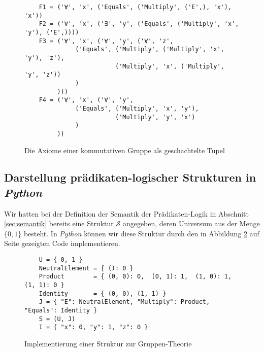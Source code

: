 \begin{figure}[!ht]
\centering
\begin{verbatim}
    F1 = ('∀', 'x', ('Equals', ('Multiply', ('E',), 'x'), 'x'))
    F2 = ('∀', 'x', ('∃', 'y', ('Equals', ('Multiply', 'x', 'y'), ('E',))))
    F3 = ('∀', 'x', ('∀', 'y', ('∀', 'z',
              ('Equals', ('Multiply', ('Multiply', 'x', 'y'), 'z'),
                         ('Multiply', 'x', ('Multiply', 'y', 'z'))
              )
         )))
    F4 = ('∀', 'x', ('∀', 'y',
              ('Equals', ('Multiply', 'x', 'y'),
                         ('Multiply', 'y', 'x')
              )
         ))        
\end{verbatim}
\vspace*{-0.3cm}
\caption{Die Axiome einer kommutativen Gruppe als geschachtelte Tupel}
\label{fig:group-theory-tupel}
\end{figure}

\subsection{Darstellung prädikaten-logischer Strukturen in \textsl{Python}}
Wir hatten bei der Definition der Semantik der Prädikaten-Logik in Abschnitt \ref{sec:semantik} bereits eine
Struktur $\mathcal{S}$ angegeben, deren Universum aus der Menge $\{ 0, 1 \}$ besteht.  In \textsl{Python}
können wir diese Struktur durch den in Abbildung \ref{fig:Group.ipynb} auf Seite \pageref{fig:Group.ipynb}
gezeigten Code implementieren. 

\begin{figure}[!ht]
\centering
\begin{verbatim}
    U = { 0, 1 }  
    NeutralElement = { (): 0 }
    Product        = { (0, 0): 0,  (0, 1): 1,  (1, 0): 1,  (1, 1): 0 }
    Identity       = { (0, 0), (1, 1) }
    J = { "E": NeutralElement, "Multiply": Product, "Equals": Identity }
    S = (U, J)
    I = { "x": 0, "y": 1, "z": 0 }
\end{verbatim}
\vspace*{-0.3cm}
\caption{Implementierung einer Struktur zur Gruppen-Theorie}
\label{fig:Group.ipynb}
\end{figure}

